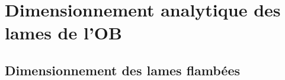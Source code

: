 

\lhead[\fancyplain{}{\leftmark}]%
      {\fancyplain{}{}} %
\chead[\fancyplain{}{}]%
      {\fancyplain{}{}}
\rhead[\fancyplain{}{}]%
      {\fancyplain{}{\rightmark}}%
\lfoot[\fancyplain{}{}]%
      {\fancyplain{}{}}
\cfoot[\fancyplain{}{\thepage}]%
      {\fancyplain{}{\thepage}} %
\rfoot[\fancyplain{}{}]%
     {\fancyplain{}{\scriptsize}}



\chapter{Dimensionnement analytique des lames de l'OB}
\label{Ann:5_Dimensionnement analytique des lames de l'OB}

\minitoc
\newpage

	\section{Dimensionnement des lames flambées}
	\label{sec:4.3:Dimensionnement des lames flambées}
